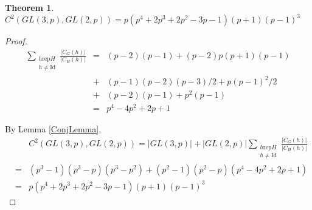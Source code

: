 \documentclass[12pt,letterpaper]{article}
\newtheorem{thm}{Theorem}
\newcommand{\rep}{\mathrm{rep}}
\newcommand{\Id}{\mathrm{Id}}
\begin{document}
\begin{thm}
$C^2(GL(3,p),GL(2,p)) = p(p^4+2p^3+2p^2-3p-1)(p+1)(p-1)^3$
\end{thm}
\begin{proof}
\begin{eqnarray*}
  \sum_{\substack{h \rep H\\ h\neq
      \Id}}\frac{|C_G(h)|}{|C_H(h)|} & = & (p-2)(p-1)+(p-2)p(p+1)(p-1)\\
  &+& (p-1)(p-2)(p-3)/2+p(p-1)^2/2\\
  &+& (p-2)(p-1)+p^2(p-1)\\
  &=& p^4-4p^2+2p+1
\end{eqnarray*}

By Lemma \ref{ConjLemma},
\begin{eqnarray*}
 & & C^2(GL(3,p),GL(2,p))  =  |GL(3,p)| + |GL(2,p)|\sum_{\substack{h \rep H\\ h\neq
    \Id}}\frac{|C_G(h)|}{|C_H(h)|}\\
 &=&  (p^3-1)(p^3-p)(p^3-p^2)+(p^2-1)(p^2-p)(p^4-4p^2+2p+1)\\
 &=& p(p^4+2p^3+2p^2-3p-1)(p+1)(p-1)^3
\end{eqnarray*}
\end{proof}
\end{document}
